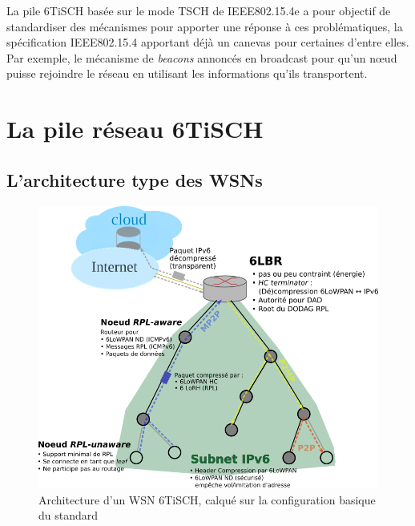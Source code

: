 \documentclass[]{report}
\begin{document}
\vspace{0.5cm}

\par La pile 6TiSCH basée sur le mode TSCH de IEEE802.15.4e a pour objectif de standardiser des mécanismes pour apporter une réponse à ces problématiques, la spécification IEEE802.15.4 apportant déjà un canevas pour certaines d'entre elles. Par exemple, le mécanisme de \textit{beacons} annoncés en broadcast pour qu'un nœud puisse rejoindre le réseau en utilisant les informations qu'ils transportent.

\newpage

\chapter{La pile réseau 6TiSCH}
\label{chap_6TiSCH}
\newpage
\section{L'architecture type des WSNs}
\label{archWSN}

	\begin{figure}[!ht]
	\centering
	\includegraphics[width=0.9\linewidth]{6TiSCH_arch}
	\caption{Architecture d'un WSN 6TiSCH, calqué sur la configuration basique du standard \cite{ietf-6tisch-architecture-28}}
	\label{fig:archWSN}
	\end{figure}

\vspace{0.2cm}
\end{document}
